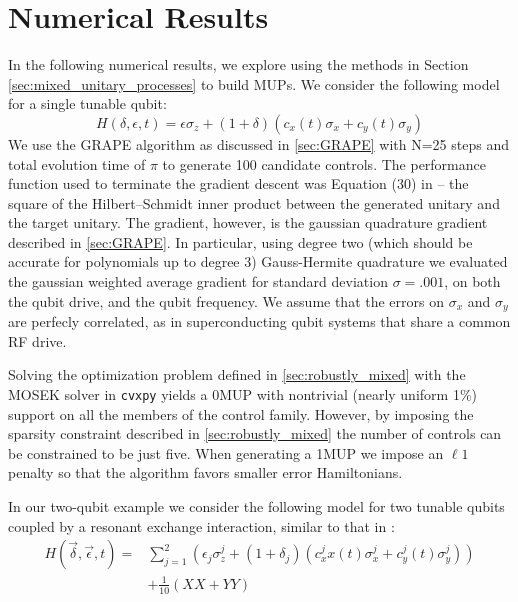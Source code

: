 \documentclass[aps,nofootinbib,pra,notitlepage,twocolumn]{revtex4-1}
\begin{document}
\section{Numerical Results}
\label{sec:numerical_results}
In the following numerical results, we explore using the methods in Section \ref{sec:mixed_unitary_processes} to build MUPs. We consider the following model for a single tunable qubit: 
\begin{equation}\label{eq:1Qham}
  H(\delta, \epsilon, t) = \epsilon\sigma_z + (1 + \delta)(c_x(t)\sigma_x + c_y(t)\sigma_y)
\end{equation}
We use the GRAPE algorithm as discussed in \ref{sec:GRAPE} with N=25 steps and total evolution time of $\pi$ to generate 100 candidate controls. The performance function used to terminate the gradient descent was Equation (30) in \cite{Khaneja2005} -- the square of the Hilbert--Schmidt inner product between the generated unitary and the target unitary. The gradient, however, is the gaussian quadrature gradient described in \ref{sec:GRAPE}. In particular, using degree two (which should be accurate for polynomials up to degree 3) Gauss-Hermite quadrature we evaluated the gaussian weighted average gradient for standard deviation $\sigma=.001$, on both the qubit drive, and the qubit frequency. We assume that the errors on $\sigma_x$ and $\sigma_y$ are perfecly correlated, as in superconducting qubit systems that share a common RF drive.

Solving the optimization problem defined in  \ref{sec:robustly_mixed} with the MOSEK solver in \texttt{cvxpy} yields a 0MUP with nontrivial (nearly uniform 1\%) support on all the members of the control family. However, by imposing the sparsity constraint described in \ref{sec:robustly_mixed} the number of controls can be constrained to be just five. When generating a 1MUP we impose an $\ell1$ penalty so that the algorithm favors smaller error Hamiltonians.

In our two-qubit example we consider the following model for two tunable qubits coupled by a resonant exchange interaction, similar to that in \cite{McKay2016}:
\begin{equation} \label{eq:2Qham}
\begin{split}
H(\vec{\delta}, \vec{\epsilon}, t) = &\sum_{j=1}^2(\epsilon_j\sigma_z^j + (1 + \delta_j)(c_x^jx(t)\sigma_x^j + c_y^j(t)\sigma_y^j)) \\
&+ \frac{1}{10}(XX + YY)
\end{split}
\end{equation}
\end{document}
